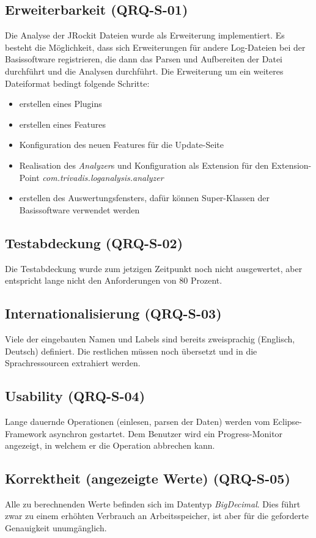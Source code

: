 \subsection{Erweiterbarkeit (QRQ-S-01)}
Die Analyse der JRockit Dateien wurde als Erweiterung implementiert. Es besteht die Möglichkeit, dass sich Erweiterungen für andere Log-Dateien bei der Basissoftware registrieren, die dann das Parsen und Aufbereiten der Datei durchführt und die Analysen durchführt. Die Erweiterung um ein weiteres Dateiformat bedingt folgende Schritte:
\begin{itemize}
\item erstellen eines Plugins
\item erstellen eines Features
\item Konfiguration des neuen Features für die Update-Seite
\item Realisation des \textit{Analyzer}s und Konfiguration als Extension für den Extension-Point \textit{com.trivadis.loganalysis.analyzer}
\item erstellen des Auswertungsfensters, dafür können Super-Klassen der Basissoftware verwendet werden
\end{itemize}

\subsection{Testabdeckung (QRQ-S-02)}
Die Testabdeckung wurde zum jetzigen Zeitpunkt noch nicht ausgewertet, aber entspricht lange nicht den Anforderungen von 80 Prozent.
\subsection{Internationalisierung (QRQ-S-03)}
Viele der eingebauten Namen und Labels sind bereits zweisprachig (Englisch, Deutsch) definiert. Die restlichen müssen noch übersetzt und in die Sprachressourcen extrahiert werden.

\subsection{Usability (QRQ-S-04)}
Lange dauernde Operationen (einlesen, parsen der Daten) werden vom Eclipse-Framework asynchron gestartet. Dem Benutzer wird ein Progress-Monitor angezeigt, in welchem er die Operation abbrechen kann.

\subsection{Korrektheit (angezeigte Werte) (QRQ-S-05)}
Alle zu berechnenden Werte befinden sich im Datentyp \textit{BigDecimal}. Dies führt zwar zu einem erhöhten Verbrauch an Arbeitsspeicher, ist aber für die geforderte Genauigkeit unumgänglich.